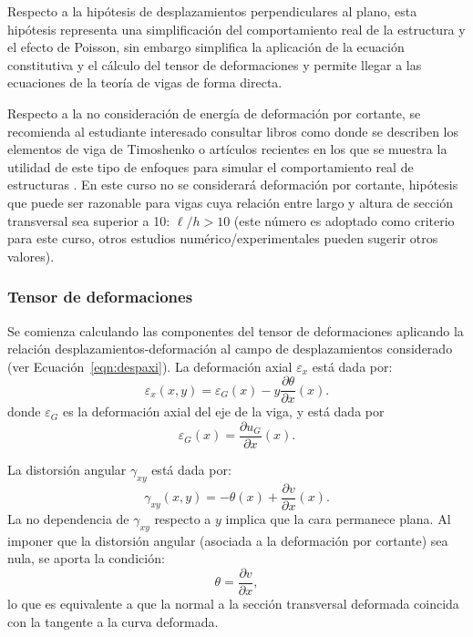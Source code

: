 Respecto a la hipótesis de desplazamientos perpendiculares al plano, esta hipótesis representa una simplificación del comportamiento real de la estructura y el efecto de Poisson, sin embargo simplifica la aplicación de la ecuación constitutiva y el cálculo del tensor de deformaciones y permite llegar a las ecuaciones de la teoría de vigas de forma directa.

Respecto a la no consideración de energía de deformación por cortante, se recomienda al estudiante interesado consultar libros como \citep{Onate2013} donde se describen los elementos de viga de Timoshenko o  artículos recientes en los que se muestra la utilidad de este tipo de enfoques para simular el comportamiento real de estructuras \citep{Bui2014}. %
%
En este curso no se considerará deformación por cortante, hipótesis que puede ser razonable para vigas cuya relación entre largo y altura de sección transversal sea superior a 10: $\ell/h > 10$ (este número es adoptado como criterio para este curso, otros estudios numérico/experimentales pueden sugerir otros valores).

\subsubsection{Tensor de deformaciones}

Se comienza calculando las componentes del tensor de deformaciones aplicando la relación desplazamientos-deformación al campo de desplazamientos considerado (ver Ecuación~\eqref{eqn:despaxi}). %
%
La deformación axial  $\varepsilon_x$ está dada por:
%
\begin{equation}\label{eqn:expdef}
\varepsilon_x(x,y) =  \varepsilon_G (x) -y \frac{\partial \theta}{\partial x}(x).
\end{equation}
%
donde $\varepsilon_G$ es la deformación axial del eje de la viga, y está dada por
%
\begin{equation}
\varepsilon_G(x) =  \frac{\partial u_G}{\partial x} (x) .
\end{equation}


La distorsión angular $\gamma_{xy}$ está dada por:
\begin{equation}\label{eq:epsG}
  \gamma_{xy}(x,y) = -\theta(x) + \frac{\partial v}{\partial x} (x).
\end{equation}
%
La no dependencia de $\gamma_{xy}$ respecto a $y$ implica que la cara permanece plana. %
%
Al imponer que la distorsión angular (asociada a la deformación por cortante) sea nula, se aporta la condición:
\begin{equation}
\boxed{
\theta = \frac{\partial v}{\partial x},
}
\end{equation}
lo que es equivalente a que la normal a la sección transversal deformada coincida con la tangente a la curva deformada.

